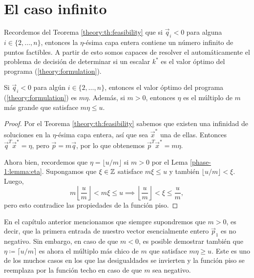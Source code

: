 \chapter{El caso infinito}


\noindent
Recordemos del Teorema \ref{theory:th:feasibility} que si $\vec{q}_i < 0$ para alguna $i \in \lbrace
2, \ldots, n \rbrace$, entonces la $\eta$-ésima capa entera contiene un número infinito de puntos
factibles. A partir de esto somos capaces de resolver el automáticamente el problema de decisión de
determinar si un escalar $k^*$ es el valor óptimo del programa (\ref{theory:formulation}).
\begin{corollary}
	Si $\vec{q}_i < 0$ para algún $i \in \lbrace 2, \ldots, n \rbrace$, entonces el valor óptimo del
	programa (\ref{theory:formulation}) es $m\eta$. Además, si $m > 0$, entonces  $\eta$ es el
	múltiplo de $m$ más grande que satisface $m\eta \leq u$.
\end{corollary}
\begin{proof}
	Por el Teorema \ref{theory:th:feasibility} sabemos que existen una infinidad de soluciones en la
	$\eta$-ésima capa entera, así que sea $\vec{x}^*$ una de ellas. Entonces $\vec{q}^T\vec{x}^* =
	\eta$, pero $\vec{p} = m\vec{q}$, por lo que obtenemos $\vec{p}^T\vec{x}^* = m\eta$.

	Ahora bien, recordemos que $\eta = \lfloor u/m \rfloor$ si $m > 0$ por el Lema
	\ref{phase-1:lemma:eta}. Supongamos que $\xi \in \mathbb{Z}$ satisface $m\xi \leq u$ y también $\lfloor
	u/m \rfloor < \xi$. Luego,
	\begin{equation*}
		m\left\lfloor \frac{u}{m} \right\rfloor < m\xi \leq u
		\implies \left\lfloor \frac{u}{m} \right\rfloor < \xi \leq \frac{u}{m},
	\end{equation*}
	pero esto contradice las propiedades de la función piso.
\end{proof}

\begin{observation}
	En el capítulo anterior mencionamos que siempre supondremos que $m > 0$, es decir, que la primera
	entrada de nuestro vector esencialmente entero $\vec{p}_1$ es no negativo. Sin embargo, en caso de
	que $m < 0$, es posible demostrar también que $\eta \coloneq \lceil u/m \rceil$ es ahora el múltiplo
	más chico de $m$ que satisface $m\eta \geq u$. Este es uno de los muchos casos en los que las
	desigualdades se invierten y la función piso se reemplaza por la función techo en caso de que $m$
	sea negativo.
\end{observation}

